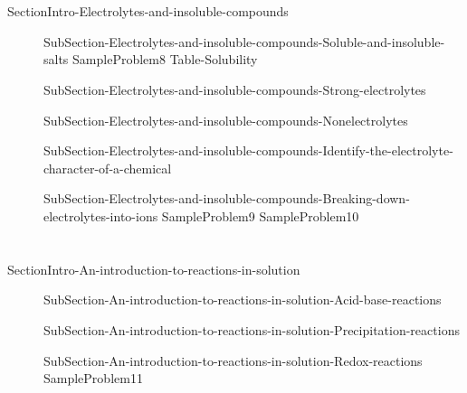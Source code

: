 \documentclass[main.tex]{subfiles} %
\begin{document}
\section{\color{blue!30!black}{Electrolytes and insoluble compounds}}
{SectionIntro-Electrolytes-and-insoluble-compounds}
\sloppy \begin{description}
\item[] {SubSection-Electrolytes-and-insoluble-compounds-Soluble-and-insoluble-salts}
{SampleProblem8}
{Table-Solubility}
\item[]{SubSection-Electrolytes-and-insoluble-compounds-Strong-electrolytes}
\item[]{SubSection-Electrolytes-and-insoluble-compounds-Nonelectrolytes}
\item[]{SubSection-Electrolytes-and-insoluble-compounds-Identify-the-electrolyte-character-of-a-chemical}
\item[]{SubSection-Electrolytes-and-insoluble-compounds-Breaking-down-electrolytes-into-ions}
{SampleProblem9}
 \hspace{-8cm}{Table-Electrolytes	}	
{SampleProblem10}
\end{description}


\section{\color{blue!30!black}{An introduction to reactions in solution}}
{SectionIntro-An-introduction-to-reactions-in-solution}
\sloppy \begin{description}
\item[] {SubSection-An-introduction-to-reactions-in-solution-Acid-base-reactions}
\item[]{SubSection-An-introduction-to-reactions-in-solution-Precipitation-reactions}
\item[]{SubSection-An-introduction-to-reactions-in-solution-Redox-reactions}
{SampleProblem11}
\end{description}
\end{document}
